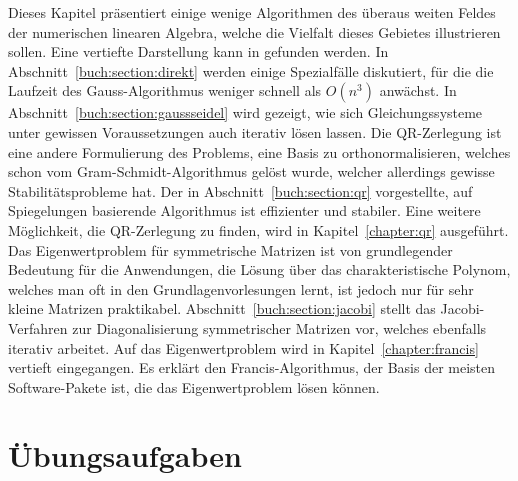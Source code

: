 Dieses Kapitel präsentiert einige wenige Algorithmen des überaus weiten
Feldes der numerischen linearen Algebra, welche die Vielfalt dieses
Gebietes illustrieren sollen.
Eine vertiefte Darstellung kann in \cite{buch:watkins} gefunden werden.
In Abschnitt~\ref{buch:section:direkt} werden einige Spezialfälle
diskutiert, für die die Laufzeit des Gauss-Algorithmus weniger schnell
als $O(n^3)$ anwächst.
In Abschnitt~\ref{buch:section:gaussseidel} wird gezeigt, wie sich
Gleichungssysteme unter gewissen Voraussetzungen auch iterativ lösen
lassen.
Die QR-Zerlegung ist eine andere Formulierung des Problems, eine Basis
zu orthonormalisieren, welches schon vom Gram-Schmidt-Algorithmus gelöst
wurde, welcher allerdings gewisse Stabilitätsprobleme hat.
Der in Abschnitt~\ref{buch:section:qr} vorgestellte, auf Spiegelungen
basierende Algorithmus ist effizienter und stabiler.
%
Eine weitere Möglichkeit, die QR-Zerlegung zu finden, wird in
Kapitel~\ref{chapter:qr} ausgeführt.
%
Das Eigenwertproblem für symmetrische Matrizen ist von grundlegender
Bedeutung für die Anwendungen, die Lösung über das charakteristische 
Polynom, welches man oft in den Grundlagenvorlesungen lernt, ist jedoch
nur für sehr kleine Matrizen praktikabel.
%
%
%
Abschnitt~\ref{buch:section:jacobi} stellt das Jacobi-Verfahren zur
Diagonalisierung symmetrischer Matrizen vor, welches ebenfalls iterativ
arbeitet.
%
Auf das Eigenwertproblem wird in Kapitel~\ref{chapter:francis} 
vertieft eingegangen. 
Es erklärt den Francis-Algorithmus, der Basis der meisten Software-Pakete
ist, die das Eigenwertproblem lösen können.
%







\section*{Übungsaufgaben}
\begin{uebungsaufgaben}
\end{uebungsaufgaben}




